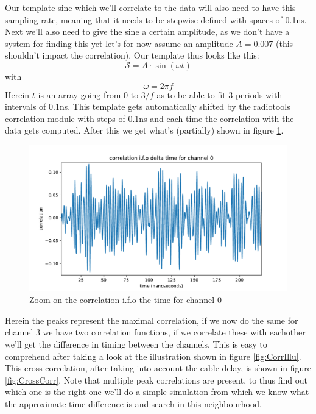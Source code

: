 \documentclass[11pt,a4paper,faculty=we,language=en,doctype=report]{cls/ugent-doc}
\begin{document}
Our template sine which we'll correlate to the data will also need to have this
sampling rate, meaning that it needs to be stepwise defined with spaces of
0.1ns. Next we'll also need to give the sine a certain amplitude, as we don't
have a system for finding this yet let's for now assume an amplitude $A =
0.007$ (this shouldn't impact the correlation).  Our template thus looks like
this:
\begin{equation}
	\mathcal{S} = A\cdot\sin(\omega t) 
\end{equation}
with
\begin{equation}
	\omega = 2\pi f
\end{equation}
Herein $t$ is an array going from 0 to $3/f$ as to be able to fit 3 periods
with intervals of 0.1ns.  This template gets automatically shifted by the radiotools
correlation module with steps of 0.1ns and each time the correlation with the
data gets computed. After this
we get what's (partially) shown in figure \ref{fig:CorrCh0}.
\begin{figure}
	\centering
	\includegraphics[width=\textwidth]{figures/CorrelationCh0.pdf}
	\caption{Zoom on the correlation i.f.o the time for channel 0}
	\label{fig:CorrCh0}
\end{figure}
Herein the peaks represent the maximal correlation, if we now do the same for
channel 3 we have two correlation functions, if we correlate these with
eachother we'll get the difference in timing between the channels.  This is
easy to comprehend after taking a look at the illustration shown in figure
\ref{fig:CorrIllu}. This cross correlation, after taking into account the cable
delay, is shown in figure \ref{fig:CrossCorr}. Note that multiple peak
correlations are present, to thus find out which one is the right one we'll do
a simple simulation from which we know what the approximate time difference is
and search in this neighbourhood.
\end{document}
